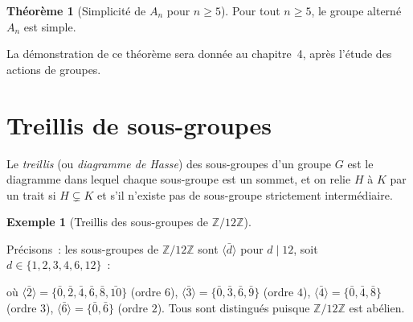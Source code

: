 \documentclass[12pt,a4paper,openany]{book}
\theoremstyle{definition}
\newtheorem{theoreme}{Théorème}[chapter]
\newtheorem{exemple}{Exemple}[chapter]
\newcommand{\Z}{\mathbb{Z}}
\newcommand{\gen}[1]{\langle #1 \rangle}
\begin{document}
\begin{theoreme}[Simplicité de $A_n$ pour $n \geq 5$]
\label{thm:An-simple}
Pour tout $n \geq 5$, le groupe alterné $A_n$ est simple.
\end{theoreme}

La démonstration de ce théorème sera donnée au chapitre~4, après l'étude des actions de
groupes.

\section{Treillis de sous-groupes}
\label{sec:ch2-treillis}

Le \emph{treillis} (ou \emph{diagramme de Hasse}) des
sous-groupes d'un groupe $G$ est le diagramme dans lequel chaque sous-groupe est un
sommet, et on relie $H$ à $K$ par un trait si $H \subsetneq K$ et s'il n'existe pas de
sous-groupe strictement intermédiaire.

\begin{exemple}[Treillis des sous-groupes de $\Z/12\Z$]
\label{ex:treillis-Z12}
\begin{center}
\end{center}
Précisons~: les sous-groupes de $\Z/12\Z$ sont $\gen{\bar{d}}$ pour $d \mid 12$, soit
$d \in \{1, 2, 3, 4, 6, 12\}$~:
\begin{center}
\end{center}
où $\gen{\bar{2}} = \{\bar{0}, \bar{2}, \bar{4}, \bar{6}, \bar{8}, \bar{10}\}$ (ordre
$6$), $\gen{\bar{3}} = \{\bar{0}, \bar{3}, \bar{6}, \bar{9}\}$ (ordre $4$),
$\gen{\bar{4}} = \{\bar{0}, \bar{4}, \bar{8}\}$ (ordre $3$), $\gen{\bar{6}} =
\{\bar{0}, \bar{6}\}$ (ordre $2$). Tous sont distingués puisque $\Z/12\Z$ est abélien.
\end{exemple}
\end{document}
